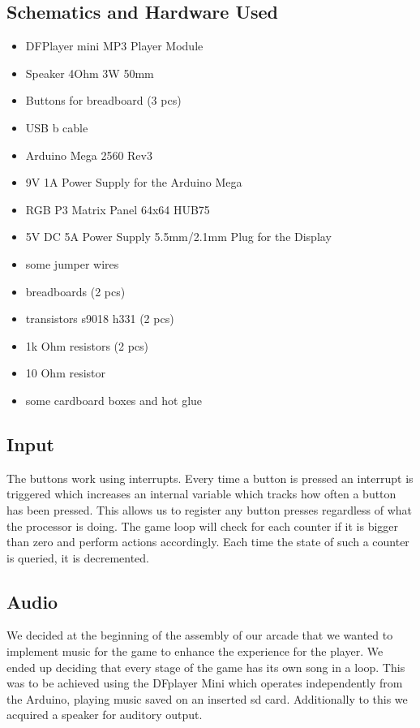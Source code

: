 \documentclass[10pt, a4paper]{article}
\begin{document}
\subsection*{Schematics and Hardware Used}
\begin{multicols}{2}
\begin{itemize}
    \item DFPlayer mini MP3 Player Module
    \item Speaker 4Ohm 3W 50mm
    \item Buttons for breadboard (3 pcs)
    \item USB b cable
    \item Arduino Mega 2560 Rev3
    \item 9V 1A Power Supply for the Arduino Mega
    \item RGB P3 Matrix Panel 64x64 HUB75
    \item 5V DC 5A Power Supply 5.5mm/2.1mm Plug for the Display
    \item some jumper wires
    \item breadboards (2 pcs)
    \item transistors s9018 h331 (2 pcs)
    \item 1k Ohm resistors (2 pcs)
    \item 10 Ohm resistor
    \item some cardboard boxes and hot glue
\end{itemize}
\end{multicols}

\subsection*{Input}
The buttons work using interrupts. Every time a button is pressed an interrupt is triggered which increases an internal variable which tracks how often a button has been pressed. This allows us to register any button presses regardless of what the processor is doing. The game loop will check for each counter if it is bigger than zero and perform actions accordingly. Each time the state of such a counter is queried, it is decremented.

\subsection*{Audio}
We decided at the beginning of the assembly of our arcade that we wanted to implement music for the game to enhance the experience for the player. We ended up deciding that every stage of the game has its own song in a loop. This was to be achieved using the DFplayer Mini which operates independently from the Arduino, playing music saved on an inserted sd card. Additionally to this we acquired a speaker for auditory output.
\end{document}
